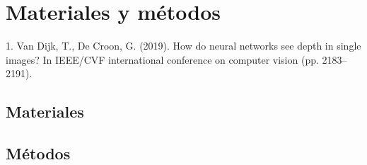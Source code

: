 \chapter{Materiales y métodos}
\thispagestyle{empty}

1. Van Dijk, T.,  De Croon, G. (2019). How do neural networks see depth in single images? In IEEE/CVF international conference on computer vision (pp. 2183–2191).

\section{Materiales}


\section{Métodos}
